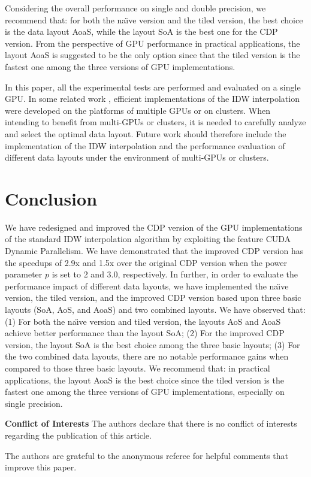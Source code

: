 Considering the overall performance on single and double precision, we 
recommend that: for both the na\"{\i}ve version and the tiled version, the 
best choice is the data layout AoaS, while the layout SoA is the best one 
for the CDP version. From the perspective of GPU performance in practical applications, the layout 
AoaS is suggested to be the only option since that the tiled version is the 
fastest one among the three versions of GPU implementations. 

In this paper, all the experimental tests are performed and evaluated on a 
single GPU. In some related work \cite{guan2010,huang2011}, efficient implementations of 
the IDW interpolation were developed on the platforms of multiple GPUs or on
clusters. When intending to benefit from multi-GPUs or clusters, it is 
needed to carefully analyze and select the optimal data layout. Future work 
should therefore include the implementation of the IDW interpolation and the 
performance evaluation of different data layouts under the environment of 
multi-GPUs or clusters. 



\section{Conclusion}
\label{sec:conclusion}

We have redesigned and improved the CDP version of the GPU implementations 
of the standard IDW interpolation algorithm by exploiting the feature CUDA 
Dynamic Parallelism. We have demonstrated that the improved CDP version has 
the speedups of 2.9x and 1.5x over the original CDP version when the power 
parameter $p$ is set to 2 and 3.0, respectively. In further, in order to 
evaluate the performance impact of different data layouts, we have 
implemented the na\"{\i}ve version, the tiled version, and the improved CDP 
version based upon three basic layouts (SoA, AoS, and AoaS) and two combined 
layouts. We have observed that: (1) For both the na\"{\i}ve version and 
tiled version, the layouts AoS and AoaS achieve better performance than the 
layout SoA; (2) For the improved CDP version, the layout SoA is the best 
choice among the three basic layouts; (3) For the two combined data layouts, 
there are no notable performance gains when compared to those three basic 
layouts. We recommend that: in practical applications, the layout AoaS is 
the best choice since the tiled version is the fastest one among the three 
versions of GPU implementations, especially on single precision. 


\begin{flushleft}
\textbf{Conflict of Interests}
The authors declare that there is no 
conflict of interests regarding the publication of this article.
\end{flushleft}

\begin{acknowledgements}
The authors are grateful to the anonymous referee 
for helpful comments that improve this paper.
\end{acknowledgements}

 
   


